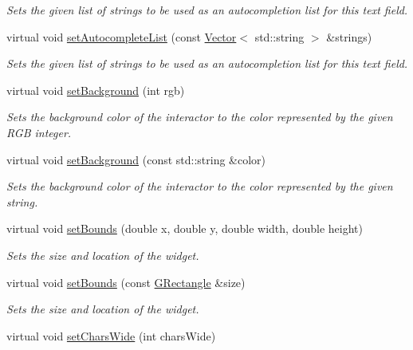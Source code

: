 \begin{DoxyCompactItemize}
\begin{DoxyCompactList}\small\item\em Sets the given list of strings to be used as an autocompletion list for this text field. \end{DoxyCompactList}\item 
virtual void \mbox{\hyperlink{classGTextField_af468683b02e61be999c76dd1100165e8}{set\+Autocomplete\+List}} (const \mbox{\hyperlink{classVector}{Vector}}$<$ std\+::string $>$ \&strings)
\begin{DoxyCompactList}\small\item\em Sets the given list of strings to be used as an autocompletion list for this text field. \end{DoxyCompactList}\item 
virtual void \mbox{\hyperlink{classGInteractor_acba7e546c2025c0a15ca4b4cc92043db}{set\+Background}} (int rgb)
\begin{DoxyCompactList}\small\item\em Sets the background color of the interactor to the color represented by the given R\+GB integer. \end{DoxyCompactList}\item 
virtual void \mbox{\hyperlink{classGInteractor_ab4677ab2474e68b07aa56605af92a84a}{set\+Background}} (const std\+::string \&color)
\begin{DoxyCompactList}\small\item\em Sets the background color of the interactor to the color represented by the given string. \end{DoxyCompactList}\item 
virtual void \mbox{\hyperlink{classGInteractor_a2aae8197624b72265ab83b4f1bc73f2f}{set\+Bounds}} (double x, double y, double width, double height)
\begin{DoxyCompactList}\small\item\em Sets the size and location of the widget. \end{DoxyCompactList}\item 
virtual void \mbox{\hyperlink{classGInteractor_acada386653f008cacc7cce86426bef7c}{set\+Bounds}} (const \mbox{\hyperlink{classGRectangle}{G\+Rectangle}} \&size)
\begin{DoxyCompactList}\small\item\em Sets the size and location of the widget. \end{DoxyCompactList}\item 
virtual void \mbox{\hyperlink{classGTextField_aef8026e0b00b17dbccfc456e75308f16}{set\+Chars\+Wide}} (int chars\+Wide)

\end{DoxyCompactItemize}
